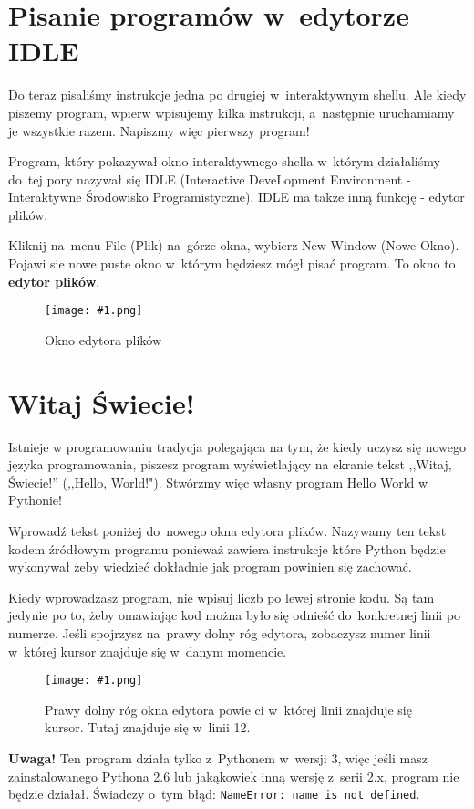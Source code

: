\documentclass{book}
\newcommand{\img}[3]{
\begin{figure}
\centerline{
	\texttt{[image: \#1.png]}
}
\caption{#2}
\label{#1}
\end{figure}
}
\begin{document}
\section{Pisanie programów w~edytorze IDLE}

Do teraz pisaliśmy instrukcje jedna po drugiej w~interaktywnym shellu. Ale kiedy piszemy program, wpierw wpisujemy kilka instrukcji, a~następnie uruchamiamy je wszystkie razem. Napiszmy więc pierwszy program!

Program, który pokazywał okno interaktywnego shella w~którym działaliśmy do~tej pory nazywał się IDLE (Interactive DeveLopment Environment - Interaktywne Środowisko Programistyczne). IDLE ma także inną funkcję - edytor plików.

Kliknij na~menu File (Plik) na~górze okna, wybierz New Window (Nowe Okno). Pojawi sie nowe puste okno w~którym będziesz mógł pisać program. To okno to {\bf edytor plików}.

\img{strings-fileeditor}{Okno edytora plików}{7 cm}

\section{Witaj Świecie!}

Istnieje w programowaniu tradycja polegająca na tym, że kiedy uczysz się nowego języka programowania, piszesz program wyświetlający na ekranie tekst ,,Witaj, Świecie!'' (,,Hello, World!"). Stwórzmy więc własny program Hello World w Pythonie!

Wprowadź tekst poniżej do~nowego okna edytora plików. Nazywamy ten tekst kodem źródłowym programu ponieważ zawiera instrukcje które Python będzie wykonywał żeby wiedzieć dokładnie jak program powinien się zachować.

Kiedy wprowadzasz program, nie wpisuj liczb po lewej stronie kodu. Są tam jedynie po to, żeby omawiając kod można było się odnieść do~konkretnej linii po numerze. Jeśli spojrzysz na~prawy dolny róg edytora, zobaczysz numer linii w~której kursor znajduje się w~danym momencie.

\img{strings-nrlinii}{Prawy dolny róg okna edytora powie ci w~której linii znajduje się kursor. Tutaj znajduje się w~linii 12.}{3 cm}


{\bf Uwaga!} Ten program działa tylko z~Pythonem w~wersji 3, więc jeśli masz zainstalowanego Pythona 2.6 lub jakąkowiek inną wersję z~serii 2.x, program nie będzie działał. Świadczy o~tym błąd: \lstinline{NameError: name is not defined}.
\end{document}
